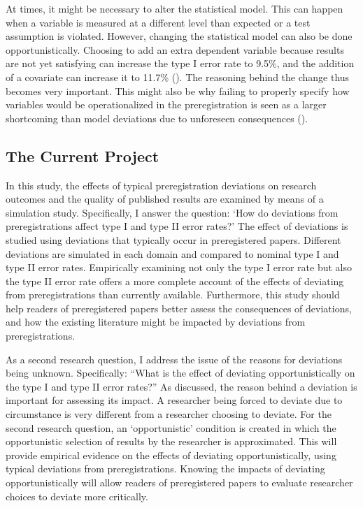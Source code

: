 \documentclass[
  man,
  floatsintext,
  longtable,
  nolmodern,
  notxfonts,
  notimes,
  colorlinks=true,linkcolor=blue,citecolor=blue,urlcolor=blue]{apa7}
\begin{document}
At times, it might be necessary to alter the statistical model. This can
happen when a variable is measured at a different level than expected or
a test assumption is violated. However, changing the statistical model
can also be done opportunistically. Choosing to add an extra dependent
variable because results are not yet satisfying can increase the type I
error rate to 9.5\%, and the addition of a covariate can increase it to
11.7\% (). The reasoning
behind the change thus becomes very important. This might also be why
failing to properly specify how variables would be operationalized in
the preregistration is seen as a larger shortcoming than model
deviations due to unforeseen consequences
().

\subsection{The Current Project}\label{the-current-project}

In this study, the effects of typical preregistration deviations on
research outcomes and the quality of published results are examined by
means of a simulation study. Specifically, I answer the question: `How
do deviations from preregistrations affect type I and type II error
rates?' The effect of deviations is studied using deviations that
typically occur in preregistered papers. Different deviations are
simulated in each domain and compared to nominal type I and type II
error rates. Empirically examining not only the type I error rate but
also the type II error rate offers a more complete account of the
effects of deviating from preregistrations than currently available.
Furthermore, this study should help readers of preregistered papers
better assess the consequences of deviations, and how the existing
literature might be impacted by deviations from preregistrations.

As a second research question, I address the issue of the reasons for
deviations being unknown. Specifically: ``What is the effect of
deviating opportunistically on the type I and type II error rates?'' As
discussed, the reason behind a deviation is important for assessing its
impact. A researcher being forced to deviate due to circumstance is very
different from a researcher choosing to deviate. For the second research
question, an `opportunistic' condition is created in which the
opportunistic selection of results by the researcher is approximated.
This will provide empirical evidence on the effects of deviating
opportunistically, using typical deviations from preregistrations.
Knowing the impacts of deviating opportunistically will allow readers of
preregistered papers to evaluate researcher choices to deviate more
critically.
\end{document}
